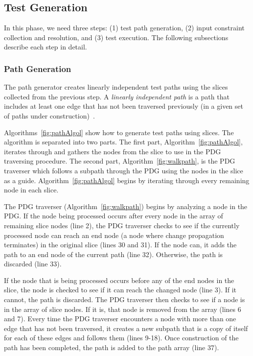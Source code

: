 
\subsection{Test Generation}




In this phase, we need three steps:
(1) test path generation, (2) input constraint collection
and resolution, and (3) test execution.
The following subsections describe each step in detail.
  
\vspace*{3pt}
\subsubsection{Path Generation}

The path generator creates linearly independent test paths 
using the slices collected from the previous step.
A {\em linearly independent path} is a path that includes 
at least one edge that has not been traversed previously 
(in a given set of paths under construction)~\cite{pressman}.

Algorithms~\ref{fig:pathAlgol}
show how to generate test paths using slices. The algorithm 
is separated into two parts. The first part, 
Algorithm~\ref{fig:pathAlgol}, iterates through and gathers 
the nodes from the slice to use in the PDG traversing procedure. 
The second part, Algorithm~\ref{fig:walkpath}, is the PDG 
traverser which follows a subpath through the PDG using 
the nodes in the slice as a guide. Algorithm~\ref{fig:pathAlgol} 
begins by iterating through every remaining node in each slice.

The PDG traverser (Algorithm~\ref{fig:walkpath}) begins 
by analyzing a node in the PDG. If the node being 
processed occurs after every node in the array of 
remaining slice nodes (line 2), the PDG traverser checks 
to see if the currently processed node can reach an end node 
(a node where change propagation terminates) in the original 
slice (lines 30 and 31). If the node can, it adds the path to 
an end node of the current path (line 32). Otherwise, the path 
is discarded (line 33).

If the node that is being processed occurs
before any of the end nodes in the slice, the node is 
checked to see if it can reach the changed node (line 3). 
If it cannot, the path is discarded.
The PDG traverser then checks to see if a node is
in the array of slice nodes. If it is, that
node is removed from the array (lines 6 and 7).
Every time the PDG traverser encounters a node with more than 
one edge that has not been traversed, it creates a new subpath 
that is a copy of itself for each of these edges and follows 
them (lines 9-18). Once construction of the path has been 
completed, the path is added to the path array (line 37).

